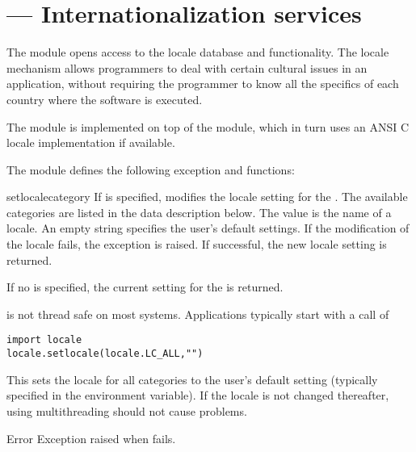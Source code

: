 \section{ ---
         Internationalization services}



The  module opens access to the \POSIX{} locale database
and functionality. The \POSIX{} locale mechanism allows programmers
to deal with certain cultural issues in an application, without
requiring the programmer to know all the specifics of each country
where the software is executed.

The  module is implemented on top of the
 module, which in turn uses an
ANSI C locale implementation if available.

The  module defines the following exception and
functions:


\begin{funcdesc}{setlocale}{category}
If  is specified, modifies the locale setting for the
. The available categories are listed in the data
description below. The value is the name of a locale. An empty string
specifies the user's default settings. If the modification of the
locale fails, the exception  is
raised. If successful, the new locale setting is returned.

If no  is specified, the current setting for the
 is returned.

 is not thread safe on most systems. Applications
typically start with a call of
\begin{verbatim}
import locale
locale.setlocale(locale.LC_ALL,"")
\end{verbatim}
This sets the locale for all categories to the user's default setting
(typically specified in the  environment variable). If
the locale is not changed thereafter, using multithreading should not
cause problems.
\end{funcdesc}

\begin{excdesc}{Error}
Exception raised when  fails.
\end{excdesc}

